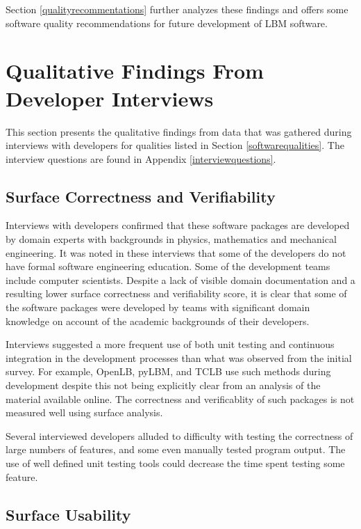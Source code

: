 \documentclass[12pt, notitlepage]{article}
\begin{document}
Section \ref{qualityrecommentations} further analyzes these findings and offers some software quality recommendations for future development of LBM software.

\newpage

\section{Qualitative Findings From Developer Interviews}\label{interviewresults}

This section presents the qualitative findings from data that was gathered during interviews with developers for qualities listed in Section \ref{softwarequalities}. The interview questions are found in Appendix \ref{interviewquestions}.

\subsection{Surface Correctness and Verifiability}

Interviews with developers confirmed that these software packages are developed by domain experts with backgrounds in physics, mathematics and mechanical engineering. It was noted in these interviews that some of the developers do not have formal software engineering education. Some of the development teams include computer scientists. Despite a lack of visible domain documentation and a resulting lower surface correctness and verifiability score, it is clear that some of the software packages were developed by teams with significant domain knowledge on account of the academic backgrounds of their developers. 

Interviews suggested a more frequent use of both unit testing and continuous integration in the development processes than what was observed from the initial survey. For example, OpenLB, pyLBM, and TCLB use such methods during development despite this not being explicitly clear from an analysis of the material available online. The correctness and verificablity of such packages is not measured well using surface analysis.

Several interviewed developers alluded to difficulty with testing the correctness of large numbers of features, and some even manually tested program output. The use of well defined unit testing tools could decrease the time spent testing some feature.

\subsection{Surface Usability}
\end{document}
